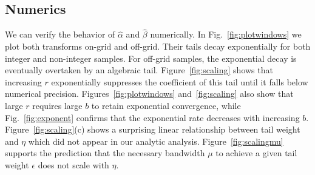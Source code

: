 \documentclass[aps,floatfix,10pt,amssymb,amsfont,amsmath,superscriptaddress,float,nofootinbib,longbibliography,nobalancelastpage,twocolumn]{revtex4-2}
\begin{document}
\subsection{Numerics}
We can verify the behavior of $\hat \alpha$ and $\hat \beta$ numerically. In Fig.~\ref{fig:plotwindows} we plot both transforms on-grid and off-grid. Their tails decay exponentially for both integer and non-integer samples. For off-grid samples, the exponential decay is eventually overtaken by an algebraic tail. Figure~\ref{fig:scaling} shows that increasing $r$ exponentially suppresses the coefficient of this tail until it falls below numerical precision. Figures~\ref{fig:plotwindows} and~\ref{fig:scaling} also show that large $r$ requires large $b$ to retain exponential convergence, while Fig.~\ref{fig:exponent} confirms that the exponential rate decreases with increasing $b$. Figure~\ref{fig:scaling}(c) shows a surprising linear relationship between tail weight and $\eta$ which did not appear in our analytic analysis. Figure~\ref{fig:scalingmu} supports the prediction that the necessary bandwidth $\mu$ to achieve a given tail weight $\epsilon$ does not scale with $\eta$. 
\end{document}
